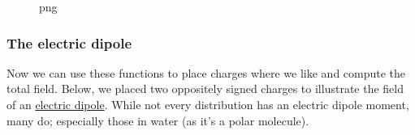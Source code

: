 \begin{Shaded}
\begin{Highlighting}[]
\OperatorTok{=}\OperatorTok{{-}}\NormalTok{, }\NormalTok{, }\NormalTok{)}
\OperatorTok{=}\OperatorTok{{-}}\NormalTok{, }\NormalTok{, }\NormalTok{)}
\OperatorTok{=}

\OperatorTok{=} \OperatorTok{{-}}  

\OperatorTok{=}
\end{Highlighting}
\end{Shaded}

\begin{figure}
\centering
{}
\caption{png}
\end{figure}

\subsubsection{The electric dipole}\label{the-electric-dipole}

Now we can use these functions to place charges where we like and
compute the total field. Below, we placed two oppositely signed charges
to illustrate the field of an
\href{https://en.wikipedia.org/wiki/Electric_dipole_moment}{electric
dipole}. While not every distribution has an electric dipole moment,
many do; especially those in water (as it's a polar molecule).

